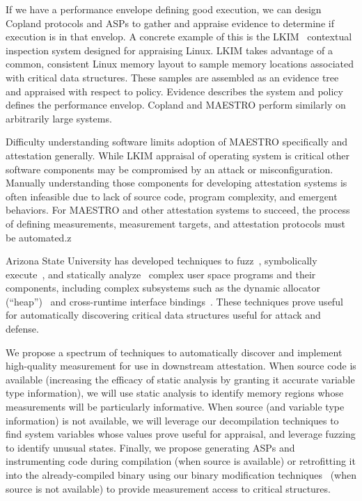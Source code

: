\documentclass[runningheads]{llncs}
\begin{document}
If we have a performance envelope defining good execution, we can design Copland
protocols and ASPs to gather and appraise evidence to determine if execution is
in that envelop.  A concrete example of this is the
LKIM~\citep{Loscocco:07:Linux-kernel-in} contextual inspection system designed
for appraising Linux.  LKIM takes advantage of a common, consistent Linux memory layout to sample memory locations associated with
critical data structures.  These samples are assembled as an evidence tree
and appraised with respect to policy.  Evidence describes the system and policy
defines the performance envelop.  Copland and MAESTRO perform similarly on
arbitrarily large systems.

Difficulty understanding software limits adoption of MAESTRO specifically and
attestation generally.  While LKIM appraisal of operating system is critical
other software components may be compromised by an attack or
misconfiguration.  Manually understanding those components for developing
attestation systems is often infeasible due to lack of source code, program
complexity, and emergent behaviors.  For MAESTRO and other attestation systems
to succeed, the process of defining measurements, measurement targets, and
attestation protocols must be automated.z

Arizona State University has developed
techniques to fuzz~\citep{trickel2022toss,salls2020exploring,peng2018t}, symbolically execute~\citep{stephens2016driller,shoshitaishvili2016sok}, and statically analyze~\citep{das2022hybrid,vadayath2022arbiter} complex user space programs and their components, including complex subsystems such as the dynamic allocator (``heap'')~\citep{eckert2018heaphopper} and cross-runtime interface bindings~\citep{dinh2021favocado}.
These techniques prove useful for automatically discovering critical data structures useful for attack and defense.

We propose a spectrum of techniques to automatically discover and
implement high-quality measurement for use in downstream attestation.
When source code is available (increasing the efficacy of static analysis by granting it accurate variable type information), we will use static analysis to identify memory regions whose measurements will be particularly informative.
When source (and variable type information) is not available, we will leverage our decompilation techniques to find system variables whose values prove useful for appraisal, and leverage fuzzing to identify unusual states.
Finally, we propose generating ASPs and instrumenting code during compilation (when source is available) or retrofitting it into the already-compiled binary using our binary modification techniques~\citep{wang2017ramblr} (when source is not available) to provide measurement access to critical structures.
\end{document}
